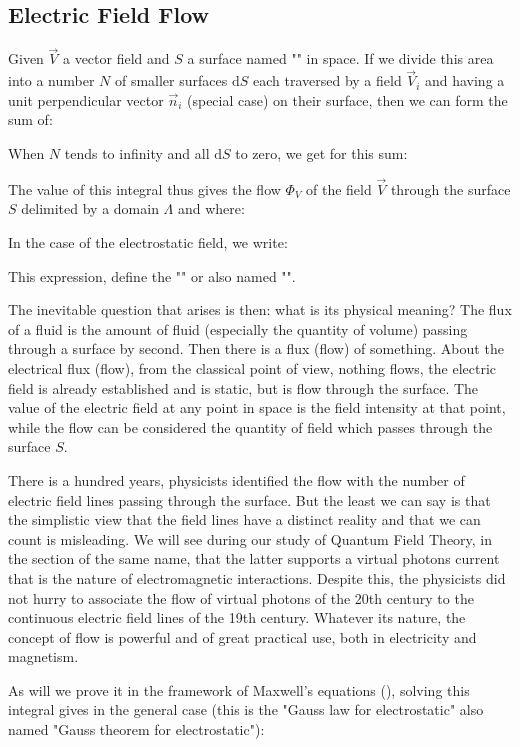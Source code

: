 	\subsection{Electric Field Flow}
	Given $\vec{V}$ a vector field and $S$ a surface named "" in space. If we divide this area into a number $N$ of smaller surfaces $\mathrm{d}S$ each traversed by a field $\vec{V}_i$ and having a unit perpendicular vector $\vec{n}_i$ (special case) on their surface, then we can form the sum of:
	
	When $N$ tends to infinity and all $\mathrm{d}S$ to zero, we get for this sum:
	
	The value of this integral thus gives the flow $\Phi_V$ of the field $\vec{V}$ through the surface $S$ delimited by a domain $\Lambda$ and where:
	
	In the case of the electrostatic field, we write:
	
	This expression, define the "" or also named "".	
	
	The inevitable question that arises is then: what is its physical meaning? The flux of a fluid is the amount of fluid (especially the quantity of volume) passing through a surface by second. Then there is a flux (flow) of something. About the electrical flux (flow), from the classical point of view, nothing flows, the electric field is already established and is static, but is flow through the surface. The value of the electric field at any point in space is the field intensity at that point, while the flow can be considered the quantity of field which passes through the surface $S$. 

	There is a hundred years, physicists identified the flow with the number of electric field lines passing through the surface. But the least we can say is that the simplistic view that the field lines have a distinct reality and that we can count is misleading. We will see during our study of Quantum Field Theory, in the section of the same name, that the latter supports a virtual photons current that is the nature of electromagnetic interactions. Despite this, the physicists did not hurry to associate the flow of virtual photons of the 20th century to the continuous electric field lines of the 19th century. Whatever its nature, the concept of flow is powerful and of great practical use, both in electricity and magnetism.
	
	As will we prove it in the framework of Maxwell's equations (), solving this integral gives in the general case (this is the "Gauss law for electrostatic" also named "Gauss theorem for electrostatic"):
	
